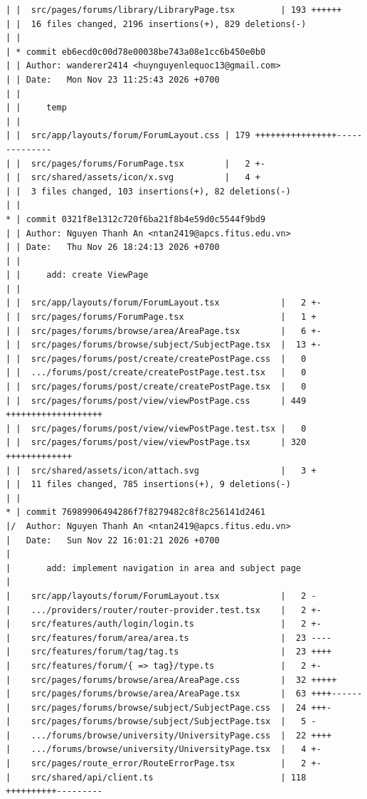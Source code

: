 \documentclass[12pt]{article}
\begin{document}
\begin{lstlisting}[numbers=none,breaklines=true]
| |  src/pages/forums/library/LibraryPage.tsx         | 193 ++++++
| |  16 files changed, 2196 insertions(+), 829 deletions(-)
| |
| * commit eb6ecd0c00d78e00038be743a08e1cc6b450e0b0
| | Author: wanderer2414 <huynguyenlequoc13@gmail.com>
| | Date:   Mon Nov 23 11:25:43 2026 +0700
| |
| |     temp
| |
| |  src/app/layouts/forum/ForumLayout.css | 179 ++++++++++++++++--------------
| |  src/pages/forums/ForumPage.tsx        |   2 +-
| |  src/shared/assets/icon/x.svg          |   4 +
| |  3 files changed, 103 insertions(+), 82 deletions(-)
| |
* | commit 0321f8e1312c720f6ba21f8b4e59d0c5544f9bd9
| | Author: Nguyen Thanh An <ntan2419@apcs.fitus.edu.vn>
| | Date:   Thu Nov 26 18:24:13 2026 +0700
| |
| |     add: create ViewPage
| |
| |  src/app/layouts/forum/ForumLayout.tsx            |   2 +-
| |  src/pages/forums/ForumPage.tsx                   |   1 +
| |  src/pages/forums/browse/area/AreaPage.tsx        |   6 +-
| |  src/pages/forums/browse/subject/SubjectPage.tsx  |  13 +-
| |  src/pages/forums/post/create/createPostPage.css  |   0
| |  .../forums/post/create/createPostPage.test.tsx   |   0
| |  src/pages/forums/post/create/createPostPage.tsx  |   0
| |  src/pages/forums/post/view/viewPostPage.css      | 449 +++++++++++++++++++
| |  src/pages/forums/post/view/viewPostPage.test.tsx |   0
| |  src/pages/forums/post/view/viewPostPage.tsx      | 320 +++++++++++++
| |  src/shared/assets/icon/attach.svg                |   3 +
| |  11 files changed, 785 insertions(+), 9 deletions(-)
| |
* | commit 76989906494286f7f8279482c8f8c256141d2461
|/  Author: Nguyen Thanh An <ntan2419@apcs.fitus.edu.vn>
|   Date:   Sun Nov 22 16:01:21 2026 +0700
|
|       add: implement navigation in area and subject page
|
|    src/app/layouts/forum/ForumLayout.tsx            |   2 -
|    .../providers/router/router-provider.test.tsx    |   2 +-
|    src/features/auth/login/login.ts                 |   2 +-
|    src/features/forum/area/area.ts                  |  23 ----
|    src/features/forum/tag/tag.ts                    |  23 ++++
|    src/features/forum/{ => tag}/type.ts             |   2 +-
|    src/pages/forums/browse/area/AreaPage.css        |  32 +++++
|    src/pages/forums/browse/area/AreaPage.tsx        |  63 ++++------
|    src/pages/forums/browse/subject/SubjectPage.css  |  24 +++-
|    src/pages/forums/browse/subject/SubjectPage.tsx  |   5 -
|    .../forums/browse/university/UniversityPage.css  |  22 ++++
|    .../forums/browse/university/UniversityPage.tsx  |   4 +-
|    src/pages/route_error/RouteErrorPage.tsx         |   2 +-
|    src/shared/api/client.ts                         | 118 ++++++++++---------

\end{lstlisting}
\end{document}
